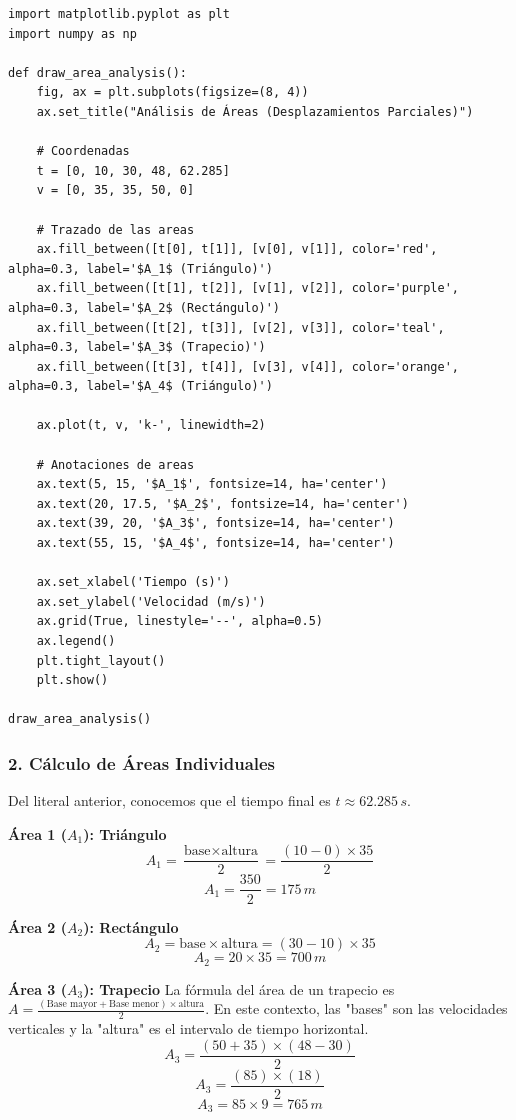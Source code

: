 \documentclass[12pt, a4paper]{article}
\begin{document}
\begin{lstlisting}
import matplotlib.pyplot as plt
import numpy as np

def draw_area_analysis():
    fig, ax = plt.subplots(figsize=(8, 4))
    ax.set_title("Análisis de Áreas (Desplazamientos Parciales)")
    
    # Coordenadas
    t = [0, 10, 30, 48, 62.285]
    v = [0, 35, 35, 50, 0]
    
    # Trazado de las areas
    ax.fill_between([t[0], t[1]], [v[0], v[1]], color='red', alpha=0.3, label='$A_1$ (Triángulo)')
    ax.fill_between([t[1], t[2]], [v[1], v[2]], color='purple', alpha=0.3, label='$A_2$ (Rectángulo)')
    ax.fill_between([t[2], t[3]], [v[2], v[3]], color='teal', alpha=0.3, label='$A_3$ (Trapecio)')
    ax.fill_between([t[3], t[4]], [v[3], v[4]], color='orange', alpha=0.3, label='$A_4$ (Triángulo)')
    
    ax.plot(t, v, 'k-', linewidth=2)
    
    # Anotaciones de areas
    ax.text(5, 15, '$A_1$', fontsize=14, ha='center')
    ax.text(20, 17.5, '$A_2$', fontsize=14, ha='center')
    ax.text(39, 20, '$A_3$', fontsize=14, ha='center')
    ax.text(55, 15, '$A_4$', fontsize=14, ha='center')

    ax.set_xlabel('Tiempo (s)')
    ax.set_ylabel('Velocidad (m/s)')
    ax.grid(True, linestyle='--', alpha=0.5)
    ax.legend()
    plt.tight_layout()
    plt.show()

draw_area_analysis()
\end{lstlisting}

\subsubsection*{2. Cálculo de Áreas Individuales}
Del literal anterior, conocemos que el tiempo final es $t \approx 62.285 \, \si{s}$.

\textbf{Área 1 ($A_1$): Triángulo}
$$ A_1 = \frac{\text{base} \times \text{altura}}{2} = \frac{(10 - 0) \times 35}{2} $$
$$ A_1 = \frac{350}{2} = 175 \, \si{m} $$

\textbf{Área 2 ($A_2$): Rectángulo}
$$ A_2 = \text{base} \times \text{altura} = (30 - 10) \times 35 $$
$$ A_2 = 20 \times 35 = 700 \, \si{m} $$

\textbf{Área 3 ($A_3$): Trapecio}
La fórmula del área de un trapecio es $A = \frac{(\text{Base mayor} + \text{Base menor}) \times \text{altura}}{2}$. En este contexto, las "bases" son las velocidades verticales y la "altura" es el intervalo de tiempo horizontal.
$$ A_3 = \frac{(50 + 35) \times (48 - 30)}{2} $$
$$ A_3 = \frac{(85) \times (18)}{2} $$
$$ A_3 = 85 \times 9 = 765 \, \si{m} $$
\end{document}
